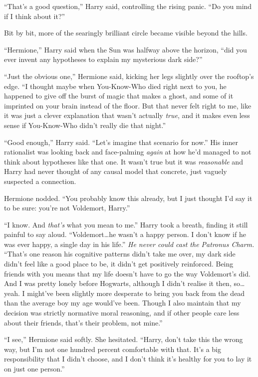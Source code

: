“That’s a good question,” Harry said, controlling the rising panic. “Do you mind if I think about it?”

Bit by bit, more of the searingly brilliant circle became visible beyond the hills.

“Hermione,” Harry said when the Sun was halfway above the horizon, “did you ever invent any hypotheses to explain my mysterious dark side?”

“Just the obvious one,” Hermione said, kicking her legs slightly over the rooftop’s edge. “I thought maybe when You-Know-Who died right next to you, he happened to give off the burst of magic that makes a ghost, and some of it imprinted on your brain instead of the floor. But that never felt right to me, like it was just a clever explanation that wasn’t actually \emph{true}, and it makes even less sense if You-Know-Who didn’t really die that night.”

“Good enough,” Harry said. “Let’s imagine that scenario for now.” His inner rationalist was looking back and face-palming \emph{again} at how he’d managed to not think about hypotheses like that one. It wasn’t true but it was \emph{reasonable} and Harry had never thought of any causal model that concrete, just vaguely suspected a connection.

Hermione nodded. “You probably know this already, but I just thought I’d say it to be sure: you’re not Voldemort, Harry.”

“I know. And \emph{that’s} what you mean to me.” Harry took a breath, finding it still painful to say aloud. “Voldemort…he wasn’t a happy person. I don’t know if he was ever happy, a single day in his life.” \emph{He never could cast the Patronus Charm.} “That’s one reason his cognitive patterns didn’t take me over, my dark side didn’t feel like a good place to be, it didn’t get positively reinforced. Being friends with you means that my life doesn’t have to go the way Voldemort’s did. And I was pretty lonely before Hogwarts, although I didn’t realise it then, so…yeah. I might’ve been slightly more desperate to bring you back from the dead than the average boy my age would’ve been. Though I also maintain that my decision was strictly normative moral reasoning, and if other people care less about their friends, that’s their problem, not mine.”

“I see,” Hermione said softly. She hesitated. “Harry, don’t take this the wrong way, but I’m not one hundred percent comfortable with that. It’s a big responsibility that I didn’t choose, and I don’t think it’s healthy for you to lay it on just one person.”

